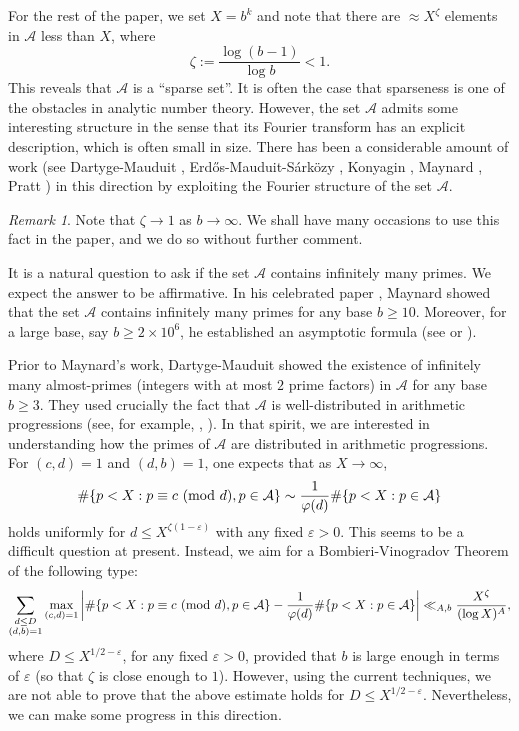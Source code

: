\documentclass[12pt]{amsart}
\numberwithin{equation}{section}
\theoremstyle{remark}
\newtheorem*{remark}{Remark}
\theoremstyle{definition}
\newcommand{\imod}[1]{\ (\mathrm{mod}\ #1)}
\begin{document}
For the rest of the paper, we set $X=b^k$ and note that there are $\approx X^{\zeta}$ elements in $\mathcal{A}$ less than $X$, where
\[\zeta :=\frac{\log(b-1)}{\log b}<1.\] 
This reveals that $\mathcal{A}$ is a ``sparse set''. It is often the case that sparseness is one of the obstacles in analytic number theory. However, the set $\mathcal{A}$ admits some interesting structure in the sense that its Fourier transform has an explicit description, which is often small in size. There has been a considerable amount of work (see Dartyge-Mauduit \cite{darmau, darmau2}, Erd\H{o}s-Mauduit-S\'ark\"ozy \cite{erdmausar, erdmausar2}, Konyagin \cite{kon}, Maynard \cite{May, May1, May2}, Pratt \cite{Pratt}) in this direction by exploiting the Fourier structure of the set $\mathcal{A}$.

\begin{remark}
Note that $\zeta \rightarrow 1$ as $b\rightarrow \infty$.  We shall have many occasions to use
this fact in the paper, and we do so without further comment.
\end{remark}


It is a natural question to ask if the set $\mathcal{A}$ contains infinitely many primes. We expect the answer to be affirmative. In his celebrated paper \cite{May1}, Maynard showed that the set $\mathcal{A}$ contains infinitely many primes for any base $b\geq 10$. Moreover, for a large base, say $b\geq 2\times 10^6$, he established an asymptotic formula (see \cite[Theorem 2.5]{May} or \cite[Theorem 1.1]{May2}).

Prior to Maynard's work, Dartyge-Mauduit \cite{darmau, darmau2} showed the existence of infinitely many almost-primes (integers with at most $2$ prime factors) in $\mathcal{A}$ for any base $b\geq 3$. They used crucially the fact that $\mathcal{A}$ is well-distributed in arithmetic progressions (see, for example, \cite{darmau}, \cite{erdmausar}). In that spirit, we are interested in understanding how the primes of $\mathcal{A}$ are distributed in arithmetic progressions.  For $(c, d)=1$ and $(d,b)=1$, one expects that as $X\to \infty$,
\begin{align}
\notag \#\{p<X:p\equiv c\imod d, p\in \mathcal{A}\} \sim \dfrac{1}{\varphi(d)}\#\{p<X:p\in \mathcal{A}\} 
\end{align}
holds uniformly for $d\leq X^{\zeta(1-\varepsilon)}$ with any fixed $\varepsilon>0$. This seems to be a difficult question at present. Instead, we aim for a Bombieri-Vinogradov Theorem of the following type:
\begin{align}
\notag \sum_{\substack{d\leq D\\(d,b)=1}}\max_{(c, d)=1}\bigg|\#\{p<X:p\equiv c\imod d, p\in \mathcal{A}\} - \dfrac{1}{\varphi(d)}\#\{p<X:p\in \mathcal{A}\}\bigg| \ll_{A,b} \dfrac{X^{\zeta}}{(\log X)^A},
\end{align}
where $D\leq X^{1/2-\varepsilon}$, for any fixed $\varepsilon>0$, provided that $b$ is large enough in terms of $\varepsilon$ (so that $\zeta$ is close enough to $1$). However, using the current techniques, we are not able to prove that the above estimate holds for $D\leq X^{1/2-\varepsilon}$. Nevertheless, we can make some progress in this direction. 
\end{document}
